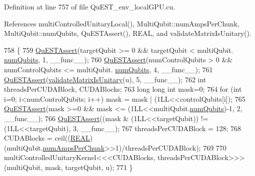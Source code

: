 Definition at line 757 of file Qu\+E\+S\+T\+\_\+env\+\_\+local\+G\+P\+U.\+cu.



References multi\+Controlled\+Unitary\+Local(), Multi\+Qubit\+::num\+Amps\+Per\+Chunk, Multi\+Qubit\+::num\+Qubits, Qu\+E\+S\+T\+Assert(), R\+E\+AL, and validate\+Matrix\+Is\+Unitary().


\begin{DoxyCode}
758 \{
759     \mbox{\hyperlink{QuEST__env__localGPU_8cu_a3587b9d533e633ccf1abf9ad2ce45d8d}{QuESTAssert}}(targetQubit >= 0 && targetQubit < multiQubit.
      \mbox{\hyperlink{structMultiQubit_ab5b9795bdc6fb5855e1974dcbbaeb36f}{numQubits}}, 1, \_\_func\_\_);
760     \mbox{\hyperlink{QuEST__env__localGPU_8cu_a3587b9d533e633ccf1abf9ad2ce45d8d}{QuESTAssert}}(numControlQubits > 0 && numControlQubits <= multiQubit.
      \mbox{\hyperlink{structMultiQubit_ab5b9795bdc6fb5855e1974dcbbaeb36f}{numQubits}}, 4, \_\_func\_\_);
761     \mbox{\hyperlink{QuEST__env__localGPU_8cu_a3587b9d533e633ccf1abf9ad2ce45d8d}{QuESTAssert}}(\mbox{\hyperlink{QuEST_8c_ae4fea133d1a8f09ff8da03038100adb2}{validateMatrixIsUnitary}}(u), 5, \_\_func\_\_);
762     \textcolor{keywordtype}{int} threadsPerCUDABlock, CUDABlocks;
763     \textcolor{keywordtype}{long} \textcolor{keywordtype}{long} \textcolor{keywordtype}{int} mask=0;
764     \textcolor{keywordflow}{for} (\textcolor{keywordtype}{int} i=0; i<numControlQubits; i++) mask = mask | (1LL<<controlQubits[i]);
765     \mbox{\hyperlink{QuEST__env__localGPU_8cu_a3587b9d533e633ccf1abf9ad2ce45d8d}{QuESTAssert}}(mask >=0 && mask <= (1LL<<multiQubit.\mbox{\hyperlink{structMultiQubit_ab5b9795bdc6fb5855e1974dcbbaeb36f}{numQubits}})-1, 2, \_\_func\_\_);
766     \mbox{\hyperlink{QuEST__env__localGPU_8cu_a3587b9d533e633ccf1abf9ad2ce45d8d}{QuESTAssert}}((mask & (1LL<<targetQubit)) != (1LL<<targetQubit), 3, \_\_func\_\_);
767     threadsPerCUDABlock = 128;
768     CUDABlocks = ceil((\mbox{\hyperlink{QuEST__precision_8h_a4b654506f18b8bfd61ad2a29a7e38c25}{REAL}})(multiQubit.\mbox{\hyperlink{structMultiQubit_a1cad83601a78635dd278259c7ed54f18}{numAmpsPerChunk}}>>1)/threadsPerCUDABlock);
769 
770     multiControlledUnitaryKernel<<<CUDABlocks, threadsPerCUDABlock>>>(multiQubit, mask, targetQubit, u);
771 \}
\end{DoxyCode}
\mbox{\label{QuEST__env__localGPU_8cu_af76f428eec6053839eb228152a51b5e3}} 
